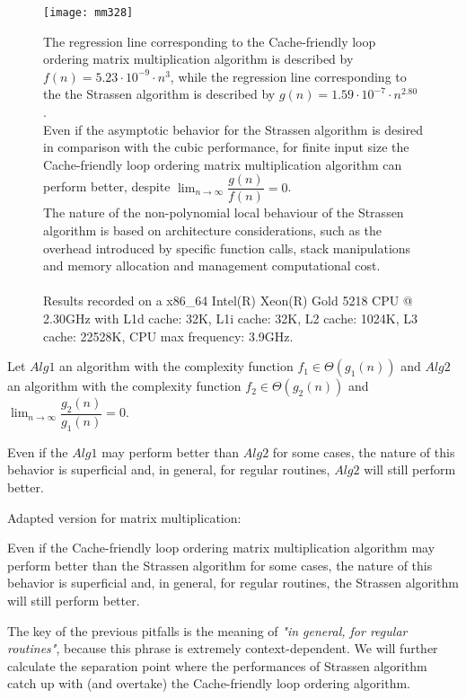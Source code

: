 \begin{figure}[H]
\centering
\texttt{[image: mm328]}
\caption{The regression line corresponding to the Cache-friendly loop ordering matrix multiplication algorithm is described by $f(n) = 5.23 \cdot 10^{-9} \cdot n^{3} $, while the regression line corresponding to the the Strassen algorithm is described by $g(n) = 1.59 \cdot 10^{-7} \cdot n^{2.80} $ . \\  Even if the asymptotic behavior for the Strassen algorithm is desired in comparison with the cubic performance, for finite input size the Cache-friendly loop ordering matrix multiplication algorithm can perform better, despite $\lim_{n\to\infty} \dfrac{g(n)}{f(n)} = 0$.  \\ The nature of the non-polynomial local behaviour of the Strassen algorithm is based on architecture considerations, such as the overhead introduced by specific function calls, stack manipulations and memory allocation and management computational cost. \\ \\ Results recorded on a x86\_64 Intel(R) Xeon(R) Gold 5218 CPU @ 2.30GHz with L1d cache: 32K, L1i cache: 32K, L2 cache: 1024K, L3 cache: 22528K, CPU max frequency: 3.9GHz.}
\end{figure}


\begin{pitfall}
Let $Alg1$ an algorithm with the complexity function $f_{1} \in \Theta(g_1(n))$  and $Alg2$ an algorithm with the complexity function $f_{2} \in \Theta(g_2(n))$ and $\lim_{n\to\infty} \dfrac{g_2(n)}{g_1(n)} = 0$.

Even if the $Alg1$ may perform better than $Alg2$ for some cases, the nature of this behavior is superficial and, in general, for regular routines, $Alg2$ will still perform better.
\end{pitfall}

\begin{pitfall}
Adapted version for matrix multiplication:

Even if the Cache-friendly loop ordering matrix multiplication algorithm may perform better than the Strassen algorithm for some cases, the nature of this behavior is superficial and, in general, for regular routines, the Strassen algorithm will still perform better.
\end{pitfall}

The key of the previous pitfalls is the meaning of \textit{"in general, for regular routines"}, because this phrase is extremely context-dependent. We will further calculate the separation point where the performances of Strassen algorithm catch up with (and overtake) the Cache-friendly loop ordering algorithm.

